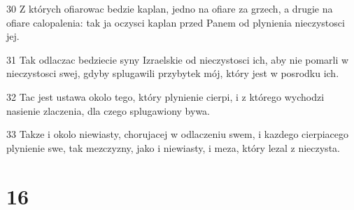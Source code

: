\par 30 Z których ofiarowac bedzie kaplan, jedno na ofiare za grzech, a drugie na ofiare calopalenia: tak ja oczysci kaplan przed Panem od plynienia nieczystosci jej.
\par 31 Tak odlaczac bedziecie syny Izraelskie od nieczystosci ich, aby nie pomarli w nieczystosci swej, gdyby splugawili przybytek mój, który jest w posrodku ich.
\par 32 Tac jest ustawa okolo tego, który plynienie cierpi, i z którego wychodzi nasienie zlaczenia, dla czego splugawiony bywa.
\par 33 Takze i okolo niewiasty, chorujacej w odlaczeniu swem, i kazdego cierpiacego plynienie swe, tak mezczyzny, jako i niewiasty, i meza, który lezal z nieczysta.

\chapter{16}

